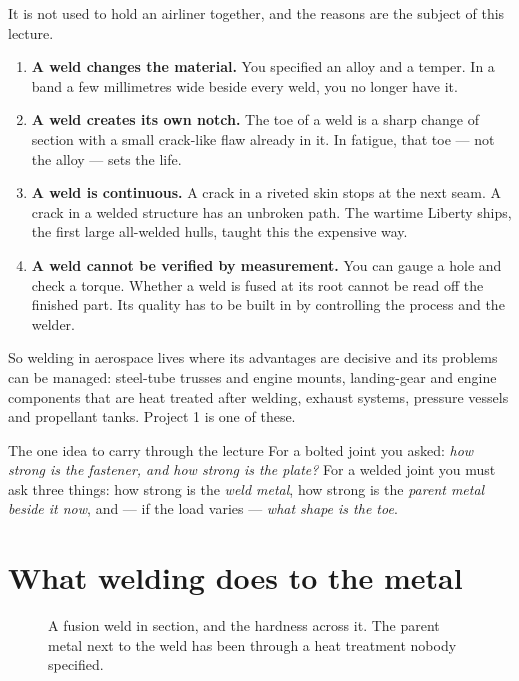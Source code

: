 \documentclass[11pt,a4paper]{article}
\begin{document}
\medskip
It is not used to hold an airliner together, and the reasons are the subject of this lecture.

\begin{enumerate}[leftmargin=*,itemsep=2pt]
\item \textbf{A weld changes the material.} You specified an alloy and a temper. In a band a few
  millimetres wide beside every weld, you no longer have it.
\item \textbf{A weld creates its own notch.} The toe of a weld is a sharp change of section with a
  small crack-like flaw already in it. In fatigue, that toe --- not the alloy --- sets the life.
\item \textbf{A weld is continuous.} A crack in a riveted skin stops at the next seam. A crack in a
  welded structure has an unbroken path. The wartime Liberty ships, the first large all-welded
  hulls, taught this the expensive way.
\item \textbf{A weld cannot be verified by measurement.} You can gauge a hole and check a torque.
  Whether a weld is fused at its root cannot be read off the finished part. Its quality has to be
  built in by controlling the process and the welder.
\end{enumerate}

So welding in aerospace lives where its advantages are decisive and its problems can be managed:
steel-tube trusses and engine mounts, landing-gear and engine components that are heat treated
after welding, exhaust systems, pressure vessels and propellant tanks. Project 1 is one of these.

\begin{keybox}{The one idea to carry through the lecture}
For a bolted joint you asked: \emph{how strong is the fastener, and how strong is the plate?} For a
welded joint you must ask three things: how strong is the \emph{weld metal}, how strong is the
\emph{parent metal beside it now}, and --- if the load varies --- \emph{what shape is the toe}.
\end{keybox}

\section{What welding does to the metal}
\label{sec:metal}

\begin{figure}[H]\centering
\resizebox{0.95\textwidth}{!}{}
\caption{A fusion weld in section, and the hardness across it. The parent metal next to the weld
has been through a heat treatment nobody specified.}
\label{fig:zones}
\end{figure}
\end{document}
